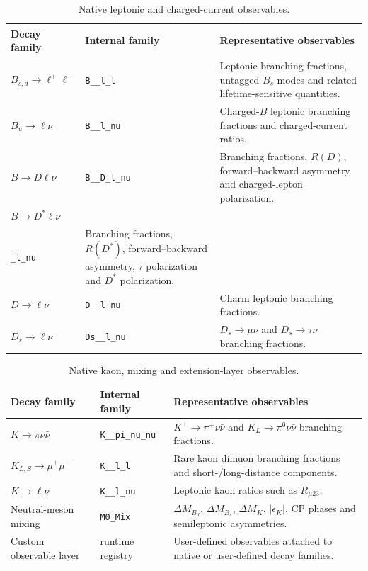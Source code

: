 \documentclass[preprint,11pt]{elsarticle}
\begin{document}
\begin{table}[!ht]
\centering
\footnotesize
\renewcommand{\arraystretch}{1.15}
\begin{tabularx}{\textwidth}{@{}p{}p{}X@{}}
\toprule
\textbf{Decay family} & \textbf{Internal family} & \textbf{Representative observables} \\
\midrule
$B_{s,d}\to\ell^+\ell^-$ & \texttt{B\_\_l\_l} &
Leptonic branching fractions, untagged $B_s$ modes and related lifetime-sensitive quantities. \\
$B_u\to\ell\nu$ & \texttt{B\_\_l\_nu} &
Charged-$B$ leptonic branching fractions and charged-current ratios. \\
$B\to D\ell\nu$ & \texttt{B\_\_D\_l\_nu} &
Branching fractions, $R(D)$, forward--backward asymmetry and charged-lepton polarization. \\
$B\to D^*\ell\nu$ & \shortstack[l]{\texttt{B\_\_Dstar}\\\texttt{\_l\_nu}} &
Branching fractions, $R(D^*)$, forward--backward asymmetry, $\tau$ polarization and $D^*$ polarization. \\
$D\to\ell\nu$ & \texttt{D\_\_l\_nu} &
Charm leptonic branching fractions. \\
$D_s\to\ell\nu$ & \texttt{Ds\_\_l\_nu} &
$D_s\to\mu\nu$ and $D_s\to\tau\nu$ branching fractions. \\
\bottomrule
\end{tabularx}
\caption{Native leptonic and charged-current observables.}
\label{tab:observable_catalogue_charged_current}
\end{table}

\begin{table}[!ht]
\centering
\footnotesize
\renewcommand{\arraystretch}{1.15}
\begin{tabularx}{\textwidth}{@{}p{}p{}X@{}}
\toprule
\textbf{Decay family} & \textbf{Internal family} & \textbf{Representative observables} \\
\midrule
$K\to\pi\nu\bar\nu$ & \texttt{K\_\_pi\_nu\_nu} &
$K^+\to\pi^+\nu\bar\nu$ and $K_L\to\pi^0\nu\bar\nu$ branching fractions. \\
$K_{L,S}\to\mu^+\mu^-$ & \texttt{K\_\_l\_l} &
Rare kaon dimuon branching fractions and short-/long-distance components. \\
$K\to\ell\nu$ & \texttt{K\_\_l\_nu} &
Leptonic kaon ratios such as $R_{\mu 23}$. \\
Neutral-meson mixing & \texttt{M0\_Mix} &
$\Delta M_{B_d}$, $\Delta M_{B_s}$, $\Delta M_K$, $|\epsilon_K|$, CP phases and semileptonic asymmetries. \\
Custom observable layer & runtime registry &
User-defined observables attached to native or user-defined decay families. \\
\bottomrule
\end{tabularx}
\caption{Native kaon, mixing and extension-layer observables.}
\label{tab:observable_catalogue_kaon_mixing}
\end{table}
\end{document}
